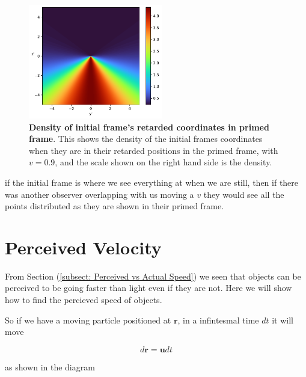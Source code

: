 \begin{figure}[H]
	\label{fig: retarded coordinate transform}
\end{figure}

\begin{figure}[H]
	\centering
	\includegraphics[height=5cm]{images/pdf/coord_transform_Retarded_Coordinate_Density_Transform.pdf}
	\caption{\textbf{Density of initial frame's retarded coordinates in primed frame}. This shows the density of the initial frames coordinates when they are in their retarded positions in the primed frame, with $v=0.9$, and the scale shown on the right hand side is the density.}
	\label{fig: Density of initial frame's retarded coordinates in primed frame}
\end{figure}

if the initial frame is where we see everything at when we are still, then if there was another observer overlapping with us moving a ${v}$ they would see all the points distributed as they are shown in their primed frame.

\section{Perceived Velocity} \label{sect: Perceived Velocity}


From Section (\ref{subsect: Perceived vs Actual Speed}) we seen that objects can be perceived to be going faster than light even if they are not.
Here we will show how to find the percieved speed of objects.

So if we have a moving particle positioned at $\mathbf{r}$, in a infintesmal time ${dt}$ it will move

\begin{equation}
	d\mathbf{r}= \mathbf{u} {dt}
\end{equation}

as shown in the diagram

